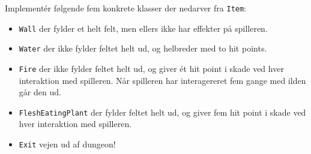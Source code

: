 Implementér følgende fem konkrete klasser der nedarver fra \lstinline{Item}:

\begin{itemize}
\item \lstinline{Wall} der fylder et helt felt, men ellers ikke har effekter på
  spilleren.
\item \lstinline{Water} der ikke fylder feltet helt ud, og helbreder med to
  hit points.
\item \lstinline{Fire} der ikke fylder feltet helt ud, og giver ét hit point i
  skade ved hver interaktion med spilleren. Når spilleren har
  interagereret fem gange med ilden går den ud.
\item \lstinline{FleshEatingPlant} der fylder feltet helt ud, og giver fem hit point i
  skade ved hver interaktion med spilleren.
\item \lstinline{Exit} vejen ud af dungeon!
\end{itemize}



